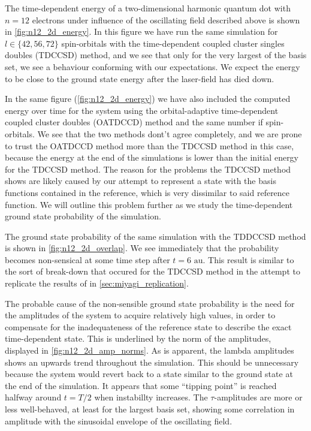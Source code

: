 The time-dependent energy of a two-dimensional harmonic quantum dot with $n=12$
electrons under influence of the oscillating field described above is shown in 
\autoref{fig:n12_2d_energy}. In this figure we have run the same simulation for 
$l\in\{42,56,72\}$ spin-orbitals with the time-dependent coupled cluster 
singles doubles (TDCCSD) method, and we see that only for the very largest of the 
basis set, we see a behaviour conforming with our expectations. We expect the 
energy to be close to the ground state energy after the laser-field has died down.

In the same figure (\autoref{fig:n12_2d_energy}) we have also included
the computed energy over time for the system using the
orbital-adaptive time-dependent coupled cluster doubles (OATDCCD) method and the 
same number if spin-orbitals.
We see that the two methods dont't agree completely, and we are prone to trust 
the OATDCCD method more than the TDCCSD method in this case, because the energy at 
the end of the simulations is lower than the initial energy for the TDCCSD method.
The reason for the problems the TDCCSD method shows are likely caused by our attempt 
to represent a state with the basis functions contained in the reference,
which is very dissimilar to said reference function. We will outline this problem 
further as we study the time-dependent ground state probability of the simulation.

The ground state probability of the same simulation with the TDDCCSD method 
is shown in
\autoref{fig:n12_2d_overlap}. We see immediately that the probability becomes 
non-sensical at some time step after $t=6 \text{ au}$. This result is similar to
the sort of break-down that occured for the TDCCSD method in the attempt to 
replicate the results of \citeauthor{miyagi2013time}\cite{miyagi2013time} in
\autoref{sec:miyagi_replication}.

The probable cause of the non-sensible 
ground state probability is the need for the amplitudes of the system to acquire 
relatively high values, in order to compensate for the inadequateness of the 
reference state to describe the exact time-dependent state. This is underlined 
by the norm of the amplitudes, displayed in \autoref{fig:n12_2d_amp_norms}. As 
is apparent, the lambda amplitudes shows an upwards trend throughout the 
simulation.
This should be unnecessary because the system would revert back to a state 
similar to the ground state at the end of the simulation. It appears that 
some ``tipping point'' is reached halfway around $t=T/2$ when instabillty 
increases. The $\tau$-amplitudes are more or less well-behaved, at least for 
the largest basis set, showing some correlation in amplitude with the
sinusoidal envelope of the oscillating field.

